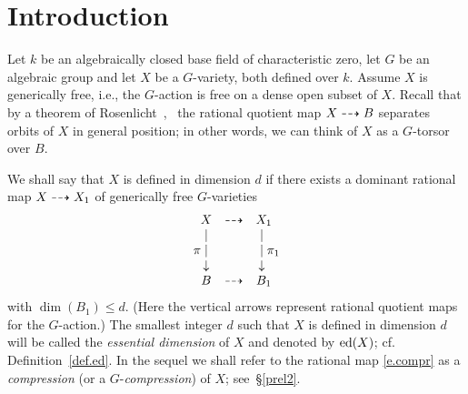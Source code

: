 
\begin{abstract}
Let $G$ be an algebraic group and let $X$ be a generically free $G$-variety.
We show that $X$ can be transformed,
by a sequence of blowups with smooth $G$-equivariant centers, into 
a $G$-variety $X'$ with the following property: the stabilizer
of every point of $X'$ is isomorphic to a semidirect product 
$U \sdp A$ of a unipotent group $U$ 
and a diagonalizable group $A$.

As an application of this result, we prove new lower 
bounds on essential dimensions of some algebraic groups. 
We also show that certain polynomials in one variable
cannot be simplified by a Tschirnhaus transformation.
\end{abstract}

\maketitle
\tableofcontents

\section{Introduction}

Let $k$ be an algebraically closed base field of characteristic zero, 
let $G$ be an algebraic group and let $X$ be 
a $G$-variety, both defined over $k$. Assume $X$ is generically 
free, i.e., the $G$-action is free on a dense open subset of $X$. Recall that
by a theorem of Rosenlicht~\cite{rosenlicht1},~\cite{rosenlicht2} the rational
quotient map $X \dasharrow B$ separates orbits of $X$ in general position; 
in other words, we can think of $X$ as a $G$-torsor over $B$.

We shall say that $X$ is defined in dimension $d$ if there exists a dominant
rational map $X \dasharrow X_1$ of generically free $G$-varieties 
\begin{equation} \label{e.compr}
 \begin{array}{ccc}  X      & \brokrarr & X_1  \\
                     |      &           &  |           \, \,     \\ 
     \llap{$\pi$\;}  |      &           &  | \rlap{\;$\pi_1$}  \, \, \\ 
                \downarrow  &           &  \downarrow   \, \,  \\ 
                    B       & \brokrarr &   B_1 
                                                    \end{array} %
\end{equation}
with $\dim(B_1)  \leq d$. (Here the vertical arrows represent 
rational quotient maps for the $G$-action.) The smallest
integer $d$ such that $X$ is defined in dimension $d$ will 
be called the {\em essential dimension} of $X$ and denoted 
by $\operatorname{ed}(X)$; cf. Definition~\ref{def.ed}.
In the sequel we shall refer to the rational map \eqref{e.compr}
as a {\em compression} (or a $G$-{\em compression}) of $X$; see~\S\ref{prel2}.


